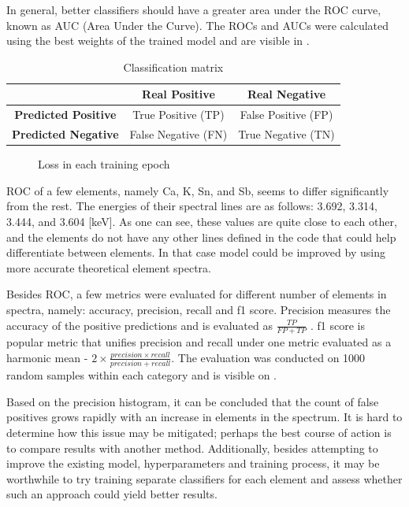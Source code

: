 In general, better classifiers should have a greater area under the ROC curve, known as AUC (Area Under the Curve). 
The ROCs and AUCs were calculated using the best weights of the trained model and are visible in .

\begin{table}[htbp!]
  \centering
  \begin{tabular}{|c|c|c|}
    \hline
    & \textbf{Real Positive} & \textbf{Real Negative} \\
    \hline
    \textbf{Predicted Positive} & True Positive (TP) & False Positive (FP) \\
    \hline
    \textbf{Predicted Negative} & False Negative (FN) & True Negative (TN) \\
    \hline
  \end{tabular}
  \caption{Classification matrix}
  \label{tab:classification_matrix}
\end{table}

\begin{figure}[htbp!]
  \centering
  
  \caption{Loss in each training epoch}
  \label{fig:vit-loss}
\end{figure}

ROC of a few elements, namely Ca, K, Sn, and Sb, seems to differ significantly from the rest. 
The energies of their spectral lines are as follows: 3.692, 3.314, 3.444, and 3.604 [keV]. 
As one can see, these values are quite close to each other, and the elements do not have any other lines defined in the code that could help differentiate between elements.
In that case model could be improved by using more accurate theoretical element spectra. 

Besides ROC, a few metrics were evaluated for different number of elements in spectra, namely: accuracy, precision, recall and f1 score. 
Precision measures the accuracy of the positive predictions and is evaluated as $\frac{TP}{FP+TP}$ .
f1 score is popular metric that unifies precision and recall under one metric evaluated as a harmonic mean -  $2\times\frac{precision \times recall}{precision + recall}$.
The evaluation was conducted on 1000 random samples within each category and is visible on .

Based on the precision histogram, it can be concluded that the count of false positives grows rapidly with an increase in elements in the spectrum. It is hard to determine how this issue may be mitigated; perhaps the best course of action is to compare results with another method. 
Additionally, besides attempting to improve the existing model, hyperparameters and training process, it may be worthwhile to try training separate classifiers for each element and assess whether such an approach could yield better results.

